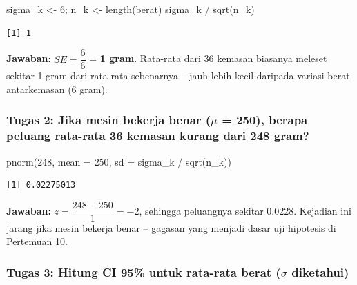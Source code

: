 \documentclass[
  indonesian,
  letterpaper,
]{book}
\newenvironment{Shaded}{\begin{snugshade}}{\end{snugshade}}
\newcommand{\AttributeTok}[1]{\textcolor[rgb]{0.40,0.45,0.13}{#1}}
\newcommand{\DecValTok}[1]{\textcolor[rgb]{0.68,0.00,0.00}{#1}}
\newcommand{\FunctionTok}[1]{\textcolor[rgb]{0.28,0.35,0.67}{#1}}
\newcommand{\NormalTok}[1]{\textcolor[rgb]{0.00,0.23,0.31}{#1}}
\newcommand{\OtherTok}[1]{\textcolor[rgb]{0.00,0.23,0.31}{#1}}
\newcommand{\SpecialCharTok}[1]{\textcolor[rgb]{0.37,0.37,0.37}{#1}}
\begin{document}
\begin{Shaded}
\begin{Highlighting}[]
\NormalTok{sigma\_k }\OtherTok{\textless{}{-}} \DecValTok{6}\NormalTok{; n\_k }\OtherTok{\textless{}{-}} \FunctionTok{length}\NormalTok{(berat)}
\NormalTok{sigma\_k }\SpecialCharTok{/} \FunctionTok{sqrt}\NormalTok{(n\_k)}
\end{Highlighting}
\end{Shaded}

\begin{verbatim}
[1] 1
\end{verbatim}

\textbf{Jawaban}: \(SE = \dfrac{6}{6}\) = \textbf{1 gram}. Rata-rata
dari 36 kemasan biasanya meleset sekitar 1 gram dari rata-rata
sebenarnya -- jauh lebih kecil daripada variasi berat antarkemasan (6
gram).

\subsubsection{\texorpdfstring{Tugas 2: Jika mesin bekerja benar
(\(\mu\) = 250), berapa peluang rata-rata 36 kemasan kurang dari 248
gram?}{Tugas 2: Jika mesin bekerja benar (\textbackslash mu = 250), berapa peluang rata-rata 36 kemasan kurang dari 248 gram?}}\label{tugas-2-jika-mesin-bekerja-benar-mu-250-berapa-peluang-rata-rata-36-kemasan-kurang-dari-248-gram}

\begin{Shaded}
\begin{Highlighting}[]
\FunctionTok{pnorm}\NormalTok{(}\DecValTok{248}\NormalTok{, }\AttributeTok{mean =} \DecValTok{250}\NormalTok{, }\AttributeTok{sd =}\NormalTok{ sigma\_k }\SpecialCharTok{/} \FunctionTok{sqrt}\NormalTok{(n\_k))}
\end{Highlighting}
\end{Shaded}

\begin{verbatim}
[1] 0.02275013
\end{verbatim}

\textbf{Jawaban:} \(z = \dfrac{248 - 250}{1} = -2\), sehingga peluangnya
sekitar 0.0228. Kejadian ini jarang jika mesin bekerja benar -- gagasan
yang menjadi dasar uji hipotesis di Pertemuan 10.

\subsubsection{\texorpdfstring{Tugas 3: Hitung CI 95\% untuk rata-rata
berat (\(\sigma\)
diketahui)}{Tugas 3: Hitung CI 95\% untuk rata-rata berat (\textbackslash sigma diketahui)}}\label{tugas-3-hitung-ci-95-untuk-rata-rata-berat-sigma-diketahui}
\end{document}
